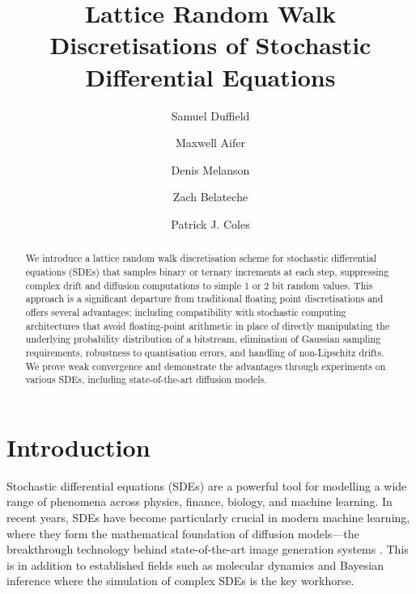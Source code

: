 \documentclass[pra,showpacs,amsmath,amssymb,amsfonts,lengthcheck,longbibliography,onecolumn]{revtex4-2}
\begin{document}
\title{Lattice Random Walk Discretisations of Stochastic Differential Equations}

\author{Samuel Duffield}
\author{Maxwell Aifer}
\author{Denis Melanson}
\author{Zach Belateche}
\author{Patrick J. Coles}




\begin{abstract}
  We introduce a lattice random walk discretisation scheme for stochastic differential equations (SDEs)
  that samples binary or ternary increments at each step, suppressing complex drift and diffusion computations
  to simple 1 or 2 bit random values. This approach is a significant departure from traditional
  floating point discretisations and offers several advantages; including
  compatibility with stochastic computing architectures that avoid floating-point arithmetic in
  place of directly manipulating the underlying probability distribution of a bitstream,
  elimination of Gaussian sampling requirements, robustness to quantisation errors, and
  handling of non-Lipschitz drifts. We prove weak convergence and demonstrate the advantages
  through experiments on various SDEs, including state-of-the-art diffusion models.
\end{abstract}

\maketitle


\section{Introduction}




Stochastic differential equations (SDEs) are a powerful tool for modelling a wide range of
phenomena across physics, finance, biology, and machine learning. In recent years, SDEs
have become particularly crucial in modern machine learning, where they form the
mathematical foundation of diffusion models—the breakthrough technology behind 
state-of-the-art image generation systems \cite{song2020score, esser2024scaling}. This is in addition to
established fields such as molecular dynamics \cite{leimkuhler2013rational} and Bayesian
inference \cite{horowitz1991generalized, duffield2024scalable} where the simulation of complex SDEs is the
key workhorse.
\end{document}
